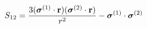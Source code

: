 \begin{equation}
S_{12} = \frac{3(\mbox{\boldmath $\sigma$}^{(1)} \cdot {\bf r})
(\mbox{\boldmath $\sigma$}^{(2)} \cdot {\bf r})}{r^{2}} -
\mbox{\boldmath $\sigma$}^{(1)} \cdot \mbox{\boldmath $\sigma$}^{(2)}     
\end{equation}

